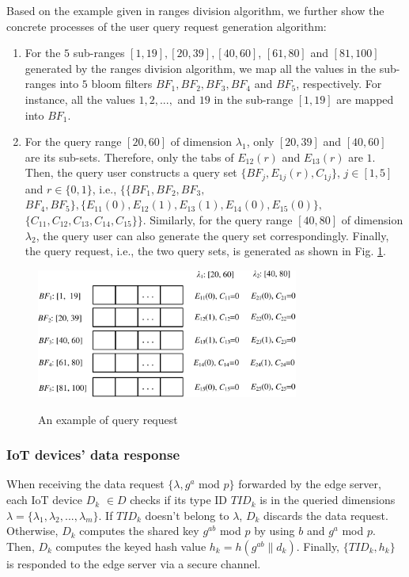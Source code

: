 \documentclass[IEEE JOURNAL OF BIOMEDICAL AND HEALTH INFORMATICS]{IEEEtran}
\begin{document}
 Based on the example given in ranges division algorithm, we further show the concrete processes of the user query request generation algorithm:
 	\begin{enumerate}
 		\item For the $5$ sub-ranges $[1, 19], [20, 39], [40, 60] $, $[61 , 80]$ and $[81, 100]$ generated by the ranges division algorithm, we map all the values in the sub-ranges into $5$ bloom filters $BF_1,BF_2,BF_3,BF_4$ and $BF_5$, respectively. For instance, all the values $1, 2, ..., $ and $ 19$ in the sub-range $[1, 19]$ are mapped into $BF_1$.
 		\item For the query range $[20, 60]$ of dimension $\lambda_1$, only $[20, 39]$ and $[40, 60]$ are its sub-sets. Therefore, only the tabs of $E_{12}(r)$ and $E_{13}(r)$ are $1$. Then, the query user constructs a query set $\{BF_j, E_{1j}(r), C_{1j}\}$, $j\in [1, 5]$ and $r \in \{0,1\}$, i.e., $\{\{BF_1, BF_2,BF_3,$ $ BF_4, BF_5\}, \{E_{11}(0),E_{12}(1), E_{13}(1), E_{14}(0), E_{15}(0)\},$ $ \{C_{11}, C_{12}, C_{13}, C_{14}, C_{15}\}\}$. Similarly, for the query range $[40, 80]$ of dimension $\lambda_2$, the query user can also generate the query set correspondingly. Finally, the query request, i.e., the two query sets, is generated as shown in Fig. \ref{query_request_example}.
 	\end{enumerate}
 	
 \begin{figure}
 	\centering
 	\includegraphics[width=3.4in]{query_request_example}\\
 	\caption{An example of query request}\label{query_request_example}
 \end{figure}

\subsubsection{IoT devices' data response}
 When receiving the data request $\{\lambda,  g^a$ mod $p\}$ forwarded by the edge server, each IoT device $D_k$ $\in D$ checks if its type ID $TID_k$ is in the queried dimensions $\lambda=\{\lambda_1, \lambda_2, ..., \lambda_m\}$. If $TID_k$ doesn't belong to $\lambda$, $D_k$ discards the data request. Otherwise, $D_k$ computes the shared key $g^{ab}$ mod $p$ by using $b$ and $g^a$ mod $p$. Then, $D_k$ computes the
  keyed hash value $h_k=h(g^{ab} \| d_k)$. Finally, $\{TID_k, h_k\}$ is responded to the edge server via a secure channel.
\end{document}

